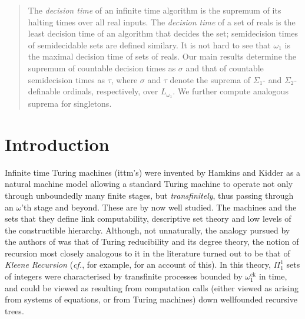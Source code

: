 \documentclass[a4paper,11pt]{amsart}
\theoremstyle{definition}
\newcommand{\ck}{\mathrm{ck}}
\newtheorem*{problem A}{Problem 1}
\newtheorem*{problem B}{Problem 2}
\theoremstyle{remark}
\begin{document}
\begin{abstract} 
The \emph{decision time} of an infinite time algorithm is the supremum of its halting times over all real inputs. 
The \emph{decision time} of a set of reals is the least decision time of an algorithm that decides the set; semidecision times of semidecidable sets are defined similary. 
It is not hard to see that $\omega_1$ is the maximal decision time of sets of reals. 
Our main results determine the supremum of countable decision times as $\sigma$ and that of countable semidecision times as $\tau$, where $\sigma$ and $\tau$ denote the suprema of $\Sigma_1$- and $\Sigma_2$-definable ordinals, respectively, over $L_{\omega_1}$. 
We further compute analogous suprema for singletons. 
\end{abstract} 

\maketitle

\thispagestyle{plain} 

\setcounter{tocdepth}{2}
\tableofcontents 



\section{Introduction}


Infinite time Turing machines (ittm's) were invented by Hamkins and Kidder as a natural machine model allowing a standard Turing machine to operate not only through unboundedly many finite stages, but {\em transfinitely}, thus passing through an $\omega$'th stage and beyond. These are by now well studied. 
The machines and the sets that they define link computability, descriptive set theory and low levels of the constructible hierarchy. Although, not unnaturally,  the analogy pursued by the authors of \cite{hamkins2000infinite} was that of Turing reducibility and its degree theory, the notion of recursion most closely analogous to it in the literature turned out to be that of {\em Kleene Recursion} ({\em cf.}, for example, \cite{Hi78} for an account of this).
In this theory, $\Pi^1_1$ sets of integers were characterised by transfinite processes bounded by $\omega_1^{\ck}$ in time, and could be viewed as resulting from computation calls (either viewed as arising from systems of equations, or from Turing machines) down wellfounded recursive trees. 
\end{document}
